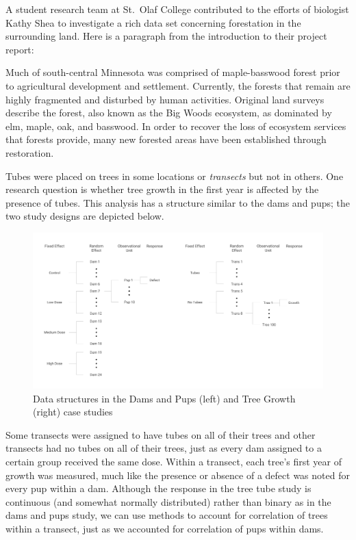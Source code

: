 \documentclass[
]{krantz}
\renewenvironment{quote}{\begin{VF}}{\end{VF}}
\begin{document}
A student research team at St.~Olaf College contributed to the efforts of biologist Kathy Shea to investigate a rich data set concerning forestation in the surrounding land. \citep{Eisinger2011} Here is a paragraph from the introduction to their project report:

\begin{quote}
Much of south-central Minnesota was comprised of maple-basswood forest prior to agricultural development and settlement. Currently, the forests that remain are highly fragmented and disturbed by human activities. Original land surveys describe the forest, also known as the Big Woods ecosystem, as dominated by elm, maple, oak, and basswood. In order to recover the loss of ecosystem services that forests provide, many new forested areas have been established through restoration.
\end{quote}

Tubes were placed on trees in some locations or \emph{transects} but not in others. One research question is whether tree growth in the first year is affected by the presence of tubes. This analysis has a structure similar to the dams and pups; the two study designs are depicted below.

\begin{figure}
\centering
\includegraphics{data/DamsTreesStructure.png}
\caption{Data structures in the Dams and Pups (left) and Tree Growth (right) case studies}
\end{figure}

Some transects were assigned to have tubes on all of their trees and other transects had no tubes on all of their trees, just as every dam assigned to a certain group received the same dose. Within a transect, each tree's first year of growth was measured, much like the presence or absence of a defect was noted for every pup within a dam. Although the response in the tree tube study is continuous (and somewhat normally distributed) rather than binary as in the dams and pups study, we can use methods to account for correlation of trees within a transect, just as we accounted for correlation of pups within dams.
\end{document}
